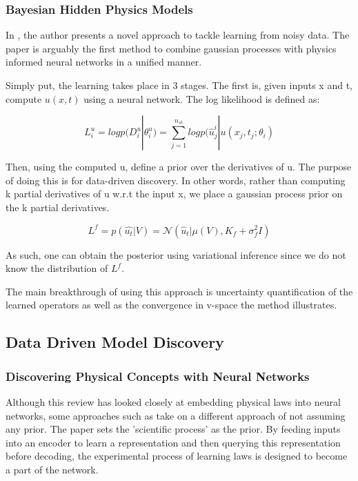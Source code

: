 \documentclass{article}
\begin{document}
\subsubsection{Bayesian Hidden Physics Models}

In \cite{atkinson_bayesian_2020}, the author presents a novel approach to tackle learning from noisy data. The paper is arguably the first method to combine gaussian processes with physics informed neural networks in a unified manner.

Simply put, the learning takes place in 3 stages. The first is, given inputs x and t, compute $u(x,t)$ using a neural network. The log likelihood is defined as:

$$ L_i^u = log p(D_i^u|\theta_i^u) = \sum_{j=1}^{n_{st}} log p(\hat{u}_j^{i} | u(x_j,t_j;\theta_i) $$

Then, using the computed u, define a prior over the derivatives of u. The purpose of doing this is for data-driven discovery. In other words, rather than computing k partial derivatives of u w.r.t the input x, we place a gaussian process prior on the k partial derivatives. 

$$ L^f = p(\hat{u_t}|V) = \mathcal{N} (\hat{u}_t|\mu(V),K_f +\sigma_f^2 I) $$

As such, one can obtain the posterior using variational inference since we do not know the distribution of $L^f$.

The main breakthrough of using this approach is uncertainty quantification of the learned operators as well as the convergence in v-space the method illustrates. 

\subsection{Data Driven Model Discovery}

\subsubsection{Discovering Physical Concepts with Neural Networks}

Although this review has looked closely at embedding physical laws into neural networks, some approaches such as \cite{iten_discovering_2020} take on a different approach of not assuming any prior. The paper sets the 'scientific process' as the prior. 
By feeding inputs into an encoder to learn a representation and then querying this representation before decoding, the experimental process of learning laws is designed to become a part of the network.
\end{document}
